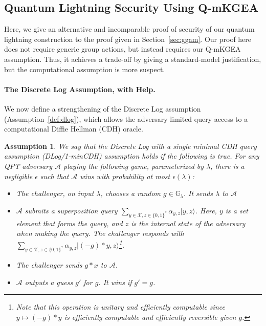 \documentclass{article}\usepackage[a4paper,margin=20mm]{geometry}
\newtheorem{assumption}[theorem]{Assumption}
\numberwithin{theorem}{section}
\numberwithin{equation}{section}
\newcommand{\G}{\mathbb{G}}
\newcommand{\As}{{\mathcal{A}}}
\newcommand{\Xs}{{\mathcal{X}}}
\begin{document}
\subsection{Quantum Lightning Security Using Q-mKGEA}\label{sec:security}

Here, we give an alternative and incomparable proof of security of our quantum lightning construction to the proof given in Section~\ref{sec:ggam}. Our proof here does not require generic group actions, but instead requires our Q-mKGEA assumption. Thus, it achieves a trade-off by giving a standard-model justification, but the computational assumption is more suspect.



\paragraph{The Discrete Log Assumption, with Help.} We now define a strengthening of the Discrete Log assumption (Assumption~\ref{def:dlog}), which allows the adversary limited query access to a computational Diffie Hellman (CDH) oracle. 

\begin{assumption}\label{def:dlogminimalcdh} We say that the \emph{Discrete Log with a single minimal CDH query} assumption (DLog/1-minCDH) assumption holds if the following is true. For any QPT adversary $\As$ playing the following game, parameterized by $\lambda$, there is a negligible $\epsilon$ such that $\As$ wins with probability at most $\epsilon(\lambda)$:
	\begin{itemize}
		\item The challenger, on input $\lambda$, chooses a random $g\in\G_\lambda$. It sends $\lambda$ to $\As$
		\item $\As$ submits a superposition query $\sum_{y\in\Xs,z\in\{0,1\}^*}\alpha_{y,z}|y,z\rangle$. Here, $y$ is a set element that forms the query, and $z$ is the internal state of the adversary when making the query. The challenger responds with $\sum_{y\in\Xs,z\in\{0,1\}^*}\alpha_{y,z}|(-g)*y,z\rangle$\enspace\footnote{Note that this operation is unitary and efficiently computable since $y\mapsto(-g)*y$ is efficiently computable and efficiently reversible given $g$.}. 
		\item The challenger sends $g*x$ to $\As$.
		\item $\As$ outputs a guess $g'$ for $g$. It wins if $g'=g$.
	\end{itemize}
\end{assumption}
\end{document}
